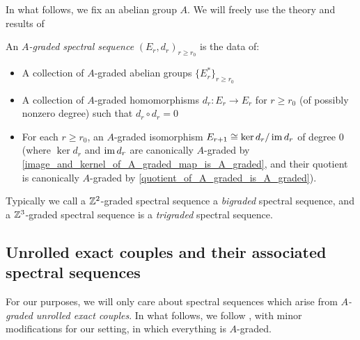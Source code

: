 \documentclass[../main.tex]{subfiles}
\begin{document}
In what follows, we fix an abelian group $A$. We will freely use the theory and results of 

\begin{definition}
    An \emph{$A$-graded spectral sequence} $(E_r,d_r)_{r\geq r_0}$ is the data of:\begin{itemize}
        \item A collection of $A$-graded abelian groups $\{E_r^{*}\}_{r\geq r_0}$
        \item A collection of $A$-graded homomorphisms $d_r:E_r\to E_r$ for $r\ge r_0$ (of possibly nonzero degree) such that $d_r\circ d_r=0$ 
        \item For each $r\geq r_0$, an $A$-graded isomorphism $E_{r+1}\cong\ker d_r/\operatorname{im} d_r$ of degree $0$ (where $\ker d_r$ and $\operatorname{im} d_r$ are canonically $A$-graded by \autoref{image_and_kernel_of_A_graded_map_is_A_graded}, and their quotient is canonically $A$-graded by \autoref{quotient_of_A_graded_is_A_graded}).
    \end{itemize}
\end{definition}

Typically we call a $\mathbb{Z}^2$-graded spectral sequence a \emph{bigraded} spectral sequence, and a $\mathbb{Z}^3$-graded spectral sequence is a \emph{trigraded} spectral sequence.

\subsection{Unrolled exact couples and their associated spectral sequences}\label{subsection:unrolled_exact_couples}

For our purposes, we will only care about spectral sequences which arise from \emph{$A$-graded unrolled exact couples}. In what follows, we follow \cite{Boardman_1999}, with minor modifications for our setting, in which everything is $A$-graded.
\end{document}
